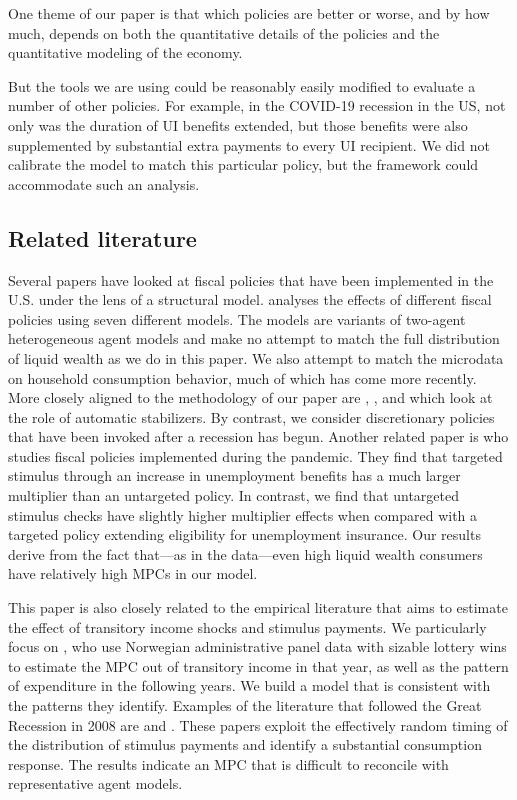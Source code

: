 \documentclass[\econtexRoot/HAFiscal]{subfiles}
\begin{document}
One theme of our paper is that which policies are better or worse, and by how much, depends on both the quantitative details of the policies and the quantitative modeling of the economy.  

But the tools we are using could be reasonably easily modified to evaluate a number of other policies.  For example, in the COVID-19 recession in the US, not only was the duration of UI benefits extended, but those benefits were also supplemented by substantial extra payments to every UI recipient.  We did not calibrate the model to match this particular policy, but the framework could accommodate such an analysis.

\hypertarget{related-literature}{}\par\subsection{Related literature}
\notinsubfile{\label{sec:lit}}

Several papers have looked at fiscal policies that have been implemented in the U.S. under the lens of a structural model. \cite{coenen2012effects} analyses the effects of different fiscal policies using seven different models. The models are variants of two-agent heterogeneous agent models and make no attempt to match the full distribution of liquid wealth as we do in this paper. We also attempt to match the microdata on household consumption behavior, much of which has come more recently.  More closely aligned to the methodology of our paper are \cite{mckay2016role}, \cite{mckay2021optimal}, and \cite{phan2024welfare} which look at the role of automatic stabilizers. By contrast, we consider discretionary policies that have been invoked after a recession has begun. Another related paper is \cite{bayercoronavirus} who studies fiscal policies implemented during the pandemic. They find that targeted stimulus through an increase in unemployment benefits has a much larger multiplier than an untargeted policy. In contrast, we find that untargeted stimulus checks have slightly higher multiplier effects when compared with a targeted policy extending eligibility for unemployment insurance. Our results derive from the fact that---as in the data---even high liquid wealth consumers have relatively high MPCs in our model.

This paper is also closely related to the empirical literature that aims to estimate the effect of transitory income shocks and stimulus payments. We particularly focus on \cite{fagereng_mpc_2021}, who use Norwegian administrative panel data with sizable lottery wins to estimate the MPC out of transitory income in that year, as well as the pattern of expenditure in the following years. We build a model that is consistent with the patterns they identify. Examples of the literature that followed the Great Recession in 2008 are \cite{parker2013consumer} and \cite{broda2014economic}. These papers exploit the effectively random timing of the distribution of stimulus payments and identify a substantial consumption response. The results indicate an MPC that is difficult to reconcile with representative agent models.
\end{document}
